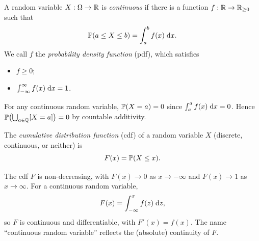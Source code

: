 \documentclass[a4paper]{article}
\begin{document}
\begin{defi}
  A random variable $X : \Omega \to \R$ is \emph{continuous} if there is a function $f : \R \to \R_{\geq 0}$ such that
  \[
    \P(a \leq X \leq b) = \int_a^b f(x) \;\d x.
  \]
  We call $f$ the \emph{probability density function} (pdf), which satisfies
  \begin{itemize}
    \item $f \geq 0$;
    \item $\int_{-\infty}^\infty f(x)\;\d x = 1$.
  \end{itemize}
\end{defi}

\begin{remark}
  For any continuous random variable, $\P(X = a) = 0$ since $\int_a^a f(x)\;\d x = 0$.
  Hence $\P\bigl(\bigcup_{a \in \Q} [X = a]\bigr) = 0$ by countable additivity.
\end{remark}

\begin{defi}
  The \emph{cumulative distribution function} (cdf) of a random variable $X$ (discrete, continuous, or neither) is
  \[
    F(x) = \P(X \leq x).
  \]
\end{defi}

\begin{remark}
  The cdf $F$ is non-decreasing, with $F(x) \to 0$ as $x \to -\infty$ and $F(x) \to 1$ as $x \to \infty$.
  For a continuous random variable,
  \[
    F(x) = \int_{-\infty}^x f(z)\;\d z,
  \]
  so $F$ is continuous and differentiable, with $F'(x) = f(x)$.
  The name ``continuous random variable'' reflects the (absolute) continuity of $F$.
\end{remark}
\end{document}
